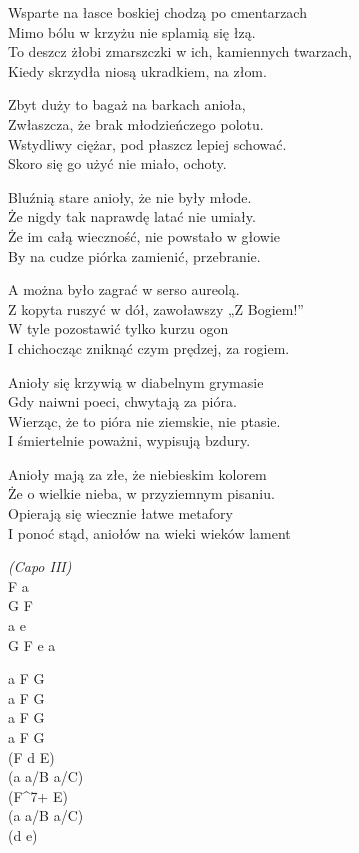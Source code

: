 \begin{text}
    \small{
    \hfill\break
Wsparte na łasce boskiej chodzą po cmentarzach\\
Mimo bólu w krzyżu nie splamią się łzą.\\
To deszcz żłobi zmarszczki w ich, kamiennych twarzach,\\
Kiedy skrzydła niosą ukradkiem, na złom.

Zbyt duży to bagaż na barkach anioła,\\
Zwłaszcza, że brak młodzieńczego polotu.\\
Wstydliwy ciężar, pod płaszcz lepiej schować.\\
Skoro się go użyć nie miało, ochoty.

Bluźnią stare anioły, że nie były młode.\\
Że nigdy tak naprawdę latać nie umiały.\\
Że im całą wieczność, nie powstało w głowie\\
By na cudze piórka zamienić, przebranie.

A można było zagrać w serso aureolą.\\
Z kopyta ruszyć w dół, zawoławszy „Z Bogiem!”\\
W tyle pozostawić tylko kurzu ogon\\
I chichocząc zniknąć czym prędzej, za rogiem.

Anioły się krzywią w diabelnym grymasie\\
Gdy naiwni poeci, chwytają za pióra.\\
Wierząc, że to pióra nie ziemskie, nie ptasie.\\
I śmiertelnie poważni, wypisują bzdury.

Anioły mają za złe, że niebieskim kolorem\\
Że o wielkie nieba, w przyziemnym pisaniu.\\
Opierają się wiecznie łatwe metafory\\
I ponoć stąd, aniołów na wieki wieków lament
    }
\end{text}
\begin{chord}
    \small{
    \textit{(Capo III)}\\
    F a\\
    G F\\
    a e\\
    G F e a

    a F G\\
    a F G\\
    a F G\\
    a F G\\
    (F d E)\\
    (a a/B a/C)\\
    (F^{7+} E)\\
    (a a/B a/C)\\
    (d e)
    }
\end{chord}